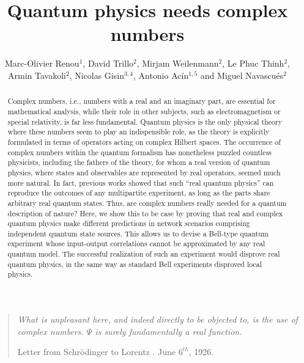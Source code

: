 \documentclass[onecolumn,prx,amsmath,amssymb]{revtex4-2}
\begin{document}
\title{Quantum physics needs complex numbers}
\author{Marc-Olivier Renou$^1$, David Trillo$^2$, Mirjam Weilenmann$^2$, Le Phuc Thinh$^2$, Armin Tavakoli$^2$, Nicolas Gisin$^{3,4}$, Antonio Ac\'in$^{1,5}$ and Miguel Navascu\'es$^2$}



\begin{abstract}
Complex numbers, i.e., numbers with a real and an imaginary part, are essential for mathematical analysis, while their role in other subjects, such as electromagnetism or special relativity, is far less fundamental. Quantum physics is the only physical theory where these numbers seem to play an indispensible role, as the theory is explicitly formulated in terms of operators acting on complex Hilbert spaces. The occurrence of complex numbers within the quantum formalism has nonetheless puzzled countless physicists, including the fathers of the theory, for whom a real version of quantum physics, where states and observables are represented by real operators, seemed much more natural. In fact, previous works showed that such ``real quantum physics'' can reproduce the outcomes of any multipartite experiment, as long as the parts share arbitrary real quantum states. Thus, are complex numbers really needed for a quantum description of nature? Here, we show this to be case by proving that real and complex quantum physics make different predictions in network scenarios comprising independent quantum state sources. This allows us to devise a Bell-type quantum experiment whose input-output correlations cannot be approximated by any real quantum model. The successful realization of such an experiment would disprove real quantum physics, in the same way as standard Bell experiments disproved local  physics.
\\
\end{abstract}
\maketitle
\begin{quote}
\emph{What is unpleasant here, and indeed directly to be objected to, is the use of complex numbers. $\Psi$ is surely fundamentally a real function.}

Letter from Schr\"{o}dinger to Lorentz \cite{einstein2011letters}. June $6^{th}$, 1926.    
\end{quote}
\end{document}
